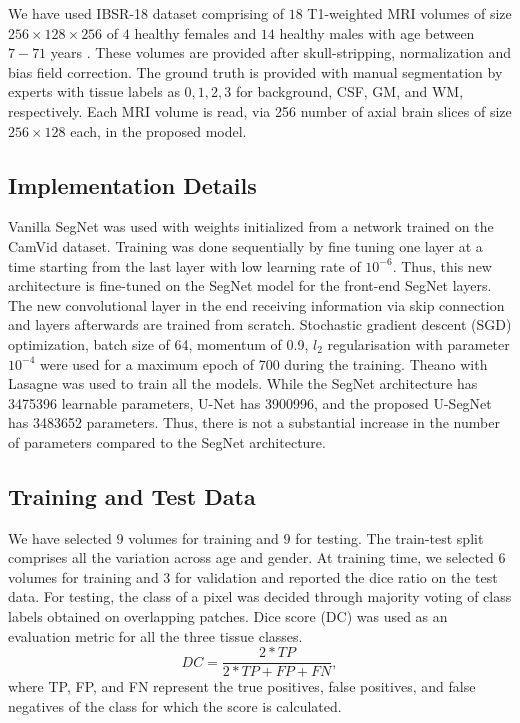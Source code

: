 \documentclass{article}
\begin{document}
We have used IBSR-18 dataset comprising of $18$ T1-weighted MRI volumes of size $256\times128\times256$ of $4$ healthy females and $14$ healthy males with age between $7-71$ years \cite{IBSR_dataset}. These volumes are provided after skull-stripping, normalization and bias field correction. The ground truth is provided with manual segmentation by experts with tissue labels as $0, 1, 2, 3$ for background, CSF, GM, and WM, respectively. Each MRI volume is read, via 256 number of axial brain slices of size $256\times128$ each, in the proposed model.

\subsection{Implementation Details}
Vanilla SegNet was used with weights initialized from a network trained on the CamVid \cite{BrostowSFC:ECCV08,BrostowFC:PRL2008} dataset. Training was done sequentially by fine tuning one layer at a time starting from the last layer with low learning rate of $10^{-6}$. Thus, this new architecture is fine-tuned on the SegNet model for the front-end SegNet layers. The new convolutional layer in the end receiving information via skip connection and layers afterwards are trained from scratch. Stochastic gradient descent (SGD) optimization, batch size of 64, momentum of 0.9, $l_2$ regularisation with parameter $10^{-4}$ were used for a maximum epoch of 700 during the training. Theano with Lasagne was used to train all the models. While the SegNet architecture has 3475396 learnable parameters, U-Net has 3900996, and the proposed U-SegNet has 3483652 parameters. Thus, there is not a substantial increase in the number of parameters compared to the SegNet architecture.

\subsection{Training and Test Data}
We have selected $9$ volumes for training and $9$ for testing. The train-test split comprises all the variation across age and gender. At training time, we selected $6$ volumes for training and $3$ for validation and reported the dice ratio on the test data. For testing, the class of a pixel was decided through majority voting of class labels obtained on overlapping patches. Dice score (DC)  was used as an evaluation metric for all the three tissue classes.
\begin{equation}
\label{eqn}
DC = \frac{2*TP}{2*TP + FP + FN},\nonumber
\end{equation}
where TP, FP, and FN represent the true positives, false positives, and false negatives of the class for which the score is calculated.
\end{document}

